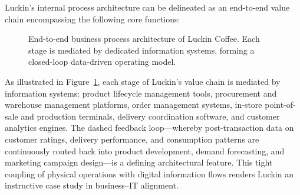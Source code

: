\documentclass[12pt,a4paper]{article}
\begin{document}
Luckin's internal process architecture can be delineated as an end-to-end value chain encompassing the following core functions:

\begin{figure}[H]
  \centering
  \caption{End-to-end business process architecture of Luckin Coffee. Each stage is mediated by dedicated information systems, forming a closed-loop data-driven operating model.\label{fig:process}}
\end{figure}

As illustrated in Figure~\ref{fig:process}, each stage of Luckin's value chain is mediated by information systems: product lifecycle management tools, procurement and warehouse management platforms, order management systems, in-store point-of-sale and production terminals, delivery coordination software, and customer analytics engines. The dashed feedback loop---whereby post-transaction data on customer ratings, delivery performance, and consumption patterns are continuously routed back into product development, demand forecasting, and marketing campaign design---is a defining architectural feature. This tight coupling of physical operations with digital information flows renders Luckin an instructive case study in business--IT alignment.
\end{document}
